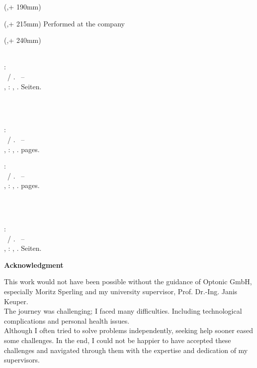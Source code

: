 \begin{textblock*}{\seitenbreite}(\bindekorrektur,\seitenanfang + 190mm)
  \centering\large 
  \textsf{\hsmadatum}
\end{textblock*}

\begin{textblock*}{\seitenbreite}(\bindekorrektur,\seitenanfang + 215mm)
  \centering\large 
  \textsf{Performed at the company \hsmafirma}
\end{textblock*}

\begin{textblock*}{\seitenbreite}(\bindekorrektur,\seitenanfang + 240mm)
  \centering\large\sffamily
  \hsmatutor \\
  \vspace{2mm}
  \hsmabetreuer\\
  \vspace{2mm}
  \hsmazweitkorrektor
\end{textblock*}

\null\newpage
\thispagestyle{empty}
  
\newcommand{\hsmabibde}{\begin{small}\textbf{\hsmaautorbib}: \\ \hsmatitelde \ / \hsmaautor. \ -- \\ \hsmatypde, \hsmaort : \hsmakoerperschaftde, \hsmajahr. \pageref{lastpage} Seiten.\end{small}}

\newcommand{\hsmabiben}{\begin{small}\textbf{\hsmaautorbib}: \\ \hsmatitelen \ / \hsmaautor. \ -- \\ \hsmatypen, \hsmaort : \hsmakoerperschaften, \hsmajahr. \pageref{lastpage} pages. \end{small}}

%
  {\hsmabibde \\ \vspace{0.5cm} \\ \hsmabiben}
  {\hsmabiben \\ \vspace{0.5cm} \\ \hsmabibde}


\clearpage\setcounter{page}{1}
\thispagestyle{empty}
\textsf{\large\textbf{Acknowledgment}}

This work would not have been possible without the guidance of Optonic GmbH, especially Moritz Sperling and my university supervisor, Prof. Dr.-Ing. Janis Keuper.\\
The journey was challenging; I faced many difficulties. Including technological complications and personal health issues. \\
Although I often tried to solve problems independently, seeking help sooner eased some challenges. In the end, I could not be happier to have accepted these challenges and navigated through them with the expertise and dedication of my supervisors.


